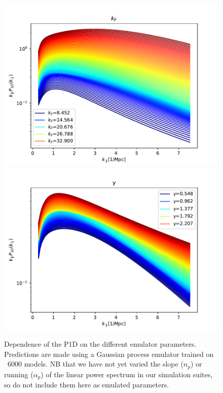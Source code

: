 \documentclass[]{article}
\begin{document}
\begin{figure}[h]
    \includegraphics[scale=0.47]{Figures/256_kF_Mpc.pdf}
    \includegraphics[scale=0.47]{Figures/256_gamma.pdf}
    \caption{Dependence of the P1D on the different emulator parameters. Predictions are 
    made using a Gaussian process emulator trained on ~6000 models. NB that we have not 
    yet varied the slope ($n_p$) or running ($\alpha_p$) of the linear power spectrum in 
    our simulation suites, so do not include them here as emulated parameters.}
\end{figure}

\clearpage
\end{document}
